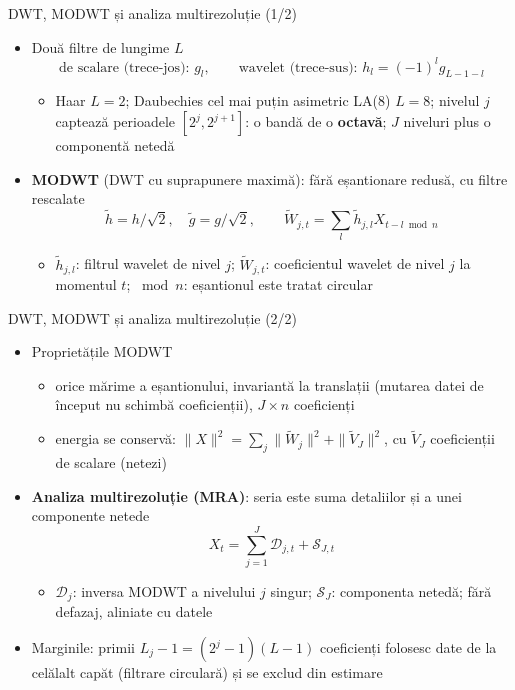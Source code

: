 \begin{frame}{DWT, MODWT și analiza multirezoluție (1/2)}
\itemsize{\small}
\begin{itemize}
    \item Două filtre de lungime $L$ 
    \[ \text{de scalare (trece-jos): } g_l, \qquad \text{wavelet (trece-sus): } h_l = (-1)^lg_{L-1-l} \]
    \begin{itemize}
        \item Haar $L = 2$; Daubechies cel mai puțin asimetric LA(8) $L = 8$; nivelul $j$ captează perioadele $[2^j, 2^{j+1}]$: o bandă de o \textbf{octavă}; $J$ niveluri plus o componentă netedă
    \end{itemize}
    \item \textbf{MODWT} (DWT cu suprapunere maximă): fără eșantionare redusă, cu filtre rescalate
    \[ \tilde h = h/\sqrt2, \quad \tilde g = g/\sqrt2, \qquad \tilde W_{j,t} = \sum_l\tilde h_{j,l}X_{t-l \bmod n} \]
    \begin{itemize}
        \item $\tilde h_{j,l}$: filtrul wavelet de nivel $j$; $\tilde W_{j,t}$: coeficientul wavelet de nivel $j$ la momentul $t$; $\bmod n$: eșantionul este tratat circular
    \end{itemize}
\end{itemize}
\end{frame}

\begin{frame}{DWT, MODWT și analiza multirezoluție (2/2)}
\itemsize{\small}
\begin{itemize}
    \item Proprietățile MODWT
    \begin{itemize}
        \item orice mărime a eșantionului, invariantă la translații (mutarea datei de început nu schimbă coeficienții), $J \times n$ coeficienți
        \item energia se conservă: $\|X\|^2 = \sum_j\|\tilde W_j\|^2 + \|\tilde V_J\|^2$, cu $\tilde V_J$ coeficienții de scalare (netezi)
    \end{itemize}
    \item \textbf{Analiza multirezoluție (MRA)}: seria este suma detaliilor și a unei componente netede
    \[ X_t = \sum_{j=1}^J\mathcal D_{j,t} + \mathcal S_{J,t} \]
    \begin{itemize}
        \item $\mathcal D_j$: inversa MODWT a nivelului $j$ singur; $\mathcal S_J$: componenta netedă; fără defazaj, aliniate cu datele
    \end{itemize}
    \item Marginile: primii $L_j - 1 = (2^j - 1)(L - 1)$ coeficienți folosesc date de la celălalt capăt (filtrare circulară) și se exclud din estimare
\end{itemize}
\end{frame}

